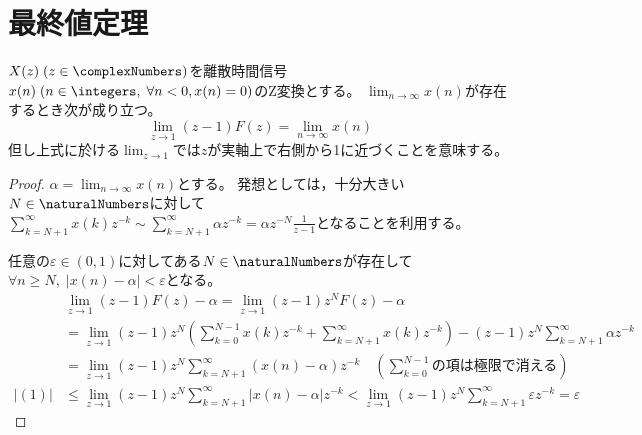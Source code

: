         \section{最終値定理}
            \begin{shadebox}
                $X(z)\;(z\in\complexNumbers)$を離散時間信号$x(n)\;(n \in \integers,\;\forall n<0,x(n)=0)$のZ変換とする。
                $\lim_{n\to\infty} x(n)$が存在するとき次が成り立つ。
                \[ \lim_{z\to1}(z-1)F(z) = \lim_{n\to\infty} x(n) \]
                但し上式に於ける$\lim_{z\to1}$では$z$が実軸上で右側から1に近づくことを意味する。
            \end{shadebox}
            \begin{proof}
                \quad\par
                $\alpha = \lim_{n\to\infty} x(n)$とする。
                発想としては，十分大きい$N\in\naturalNumbers$に対して$\sum_{k=N+1}^\infty x(k)z^{-k} \sim \sum_{k=N+1}^\infty \alpha z^{-k} = \alpha z^{-N}\frac{1}{z-1}$となることを利用する。
                \par
                任意の$\varepsilon \in (0,1)$に対してある$N\in\naturalNumbers$が存在して$\forall n\geq N,\;|x(n)-\alpha|<\varepsilon$となる。
                \begin{align*}
                    \quad &\lim_{z\to1}(z-1)F(z) - \alpha = \lim_{z\to1}(z-1)z^N F(z) - \alpha \\
                    &= \lim_{z\to1}(z-1)z^N\left(\sum_{k=0}^{N-1} x(k)z^{-k} + \sum_{k=N+1}^\infty x(k)z^{-k}\right) - (z-1)z^N\sum_{k=N+1}^\infty \alpha z^{-k} \\
                    &= \lim_{z\to1}(z-1)z^N \sum_{k=N+1}^\infty (x(n) - \alpha)z^{-k} \quad \left(\sum_{k=0}^{N-1}\text{の項は極限で消える}\right) \tag{1} \\
                    |(1)| &\leq \lim_{z\to1}(z-1)z^N \sum_{k=N+1}^\infty |x(n) - \alpha|z^{-k} < \lim_{z\to1}(z-1)z^N \sum_{k=N+1}^\infty \varepsilon z^{-k} = \varepsilon
                \end{align*}
            \end{proof}
